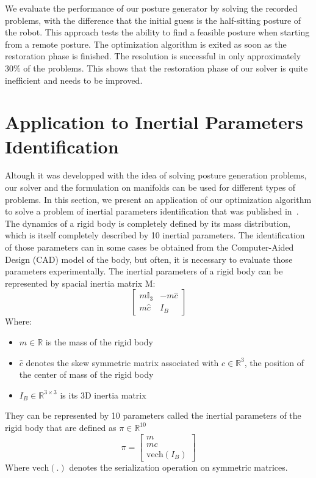 We evaluate the performance of our posture generator by solving the recorded problems, with the difference that the initial guess is the half-sitting posture of the robot.
This approach tests the ability to find a feasible posture when starting from a remote posture.
The optimization algorithm is exited as soon as the restoration phase is finished.
The resolution is successful in only approximately 30\% of the problems.
This shows that the restoration phase of our solver is quite inefficient and needs to be improved.

\section{Application to Inertial Parameters Identification}
\label{sec:inertial_parameters}

Altough it was developped with the idea of solving posture generation problems, our solver and the formulation on manifolds can be used for different types of problems.
In this section, we present an application of our optimization algorithm to solve a problem of inertial parameters identification that was published in~\cite{traversaro:iros:2016}.
The dynamics of a rigid body is completely defined by its mass distribution, which is itself completely described by 10 inertial parameters.
The identification of those parameters can in some cases be obtained from the Computer-Aided Design (CAD) model of the body, but often, it is necessary to evaluate those parameters experimentally.
The inertial parameters of a rigid body can be represented by spacial inertia matrix M:
\begin{equation}
  \begin{bmatrix}
    m\mathbb{I}_3 & -m\hat{c} \\
    m\hat{c} & I_B
  \end{bmatrix}
\end{equation}
Where:
\begin{itemize}
  \item $m\in\mathbb{R}$ is the mass of the rigid body
  \item $\hat{c}$ denotes the skew symmetric matrix associated with $c\in\mathbb{R}^3$, the position of the center of mass of the rigid body
  \item $I_B\in\mathbb{R}^{3\times 3}$ is its 3D inertia matrix
\end{itemize}
They can be represented by 10 parameters called the inertial parameters of the rigid body that are defined as $\pi\in\mathbb{R}^{10}$
\begin{equation}
  \pi = \begin{bmatrix}
    m \\
    mc \\
    \text{vech}(I_B)
  \end{bmatrix}
\end{equation}
Where $\text{vech}(.)$ denotes the serialization operation on symmetric matrices.

